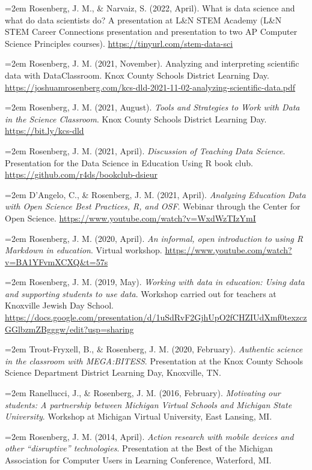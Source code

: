 \documentclass[
  14,
]{article}
\begin{document}
\hangindent=2em Rosenberg, J. M., \& Narvaiz, S. (2022, April). What is
data science and what do data scientists do? A presentation at L\&N STEM
Academy (L\&N STEM Career Connections presentation and presentation to
two AP Computer Science Principles courses).
\url{https://tinyurl.com/stem-data-sci}

\hangindent=2em Rosenberg, J. M. (2021, November). Analyzing and
interpreting scientific data with DataClassroom. Knox County Schools
District Learning Day.
\url{https://joshuamrosenberg.com/kcs-dld-2021-11-02-analyzing-scientific-data.pdf}

\hangindent=2em Rosenberg, J. M. (2021, August). \emph{Tools and
Strategies to Work with Data in the Science Classroom}. Knox County
Schools District Learning Day. \url{https://bit.ly/kcs-dld}

\hangindent=2em Rosenberg, J. M. (2021, April). \emph{Discussion of
Teaching Data Science}. Presentation for the Data Science in Education
Using R book club. \url{https://github.com/r4ds/bookclub-dsieur}

\hangindent=2em D'Angelo, C., \& Rosenberg, J. M. (2021, April).
\emph{Analyzing Education Data with Open Science Best Practices, R, and
OSF}. Webinar through the Center for Open Science.
\url{https://www.youtube.com/watch?v=WxdWzTIzYmI}

\hangindent=2em Rosenberg, J. M. (2020, April). \emph{An informal, open
introduction to using R Markdown in education}. Virtual workshop.
\url{https://www.youtube.com/watch?v=BA1YFvmXCXQ\&t=57s}

\hangindent=2em Rosenberg, J. M. (2019, May). \emph{Working with data in
education: Using data and supporting students to use data}. Workshop
carried out for teachers at Knoxville Jewish Day School.
\url{https://docs.google.com/presentation/d/1uSdRvF2GjhUpO2fCHZIUdXmf0texzczGGlbzmZBgggw/edit?usp=sharing}

\hangindent=2em Trout-Fryxell, B., \& Rosenberg, J. M. (2020, February).
\emph{Authentic science in the classroom with MEGA:BITESS}. Presentation
at the Knox County Schools Science Department District Learning Day,
Knoxville, TN.

\hangindent=2em Ranellucci, J., \& Rosenberg, J. M. (2016, February).
\emph{Motivating our students: A partnership between Michigan Virtual
Schools and Michigan State University}. Workshop at Michigan Virtual
University, East Lansing, MI.

\hangindent=2em Rosenberg, J. M. (2014, April). \emph{Action research
with mobile devices and other ``disruptive'' technologies}. Presentation
at the Best of the Michigan Association for Computer Users in Learning
Conference, Waterford, MI.
\end{document}
